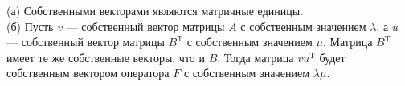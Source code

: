\documentclass{article}
\begin{document}
(а) Собственными векторами являются матричные единицы.\\
(б) Пусть $v$ --- собственный вектор матрицы $A$ с собственным значением $\lambda$, а $u$ --- собственный вектор матрицы $B^{\mathrm{T}}$ с собственным значением $\mu$. Матрица $B^{\mathrm{T}}$ имеет те же собственные векторы, что и $B$. Тогда матрица $v u^{\mathrm{T}}$ будет собственным вектором оператора $F$ с собственным значением $\lambda \mu$.
\end{document}
